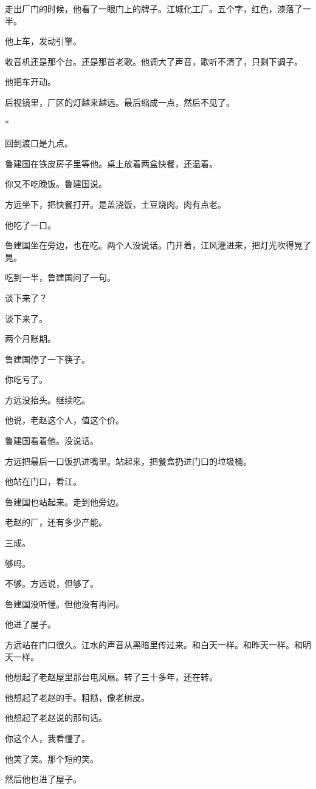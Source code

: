 \documentclass[UTF8,a5paper,11pt,openany]{ctexbook}
\newcommand{\scene}{\vspace{1em}\begin{center}*\quad*\quad*\end{center}\vspace{0.5em}}
\begin{document}
走出厂门的时候，他看了一眼门上的牌子。江城化工厂。五个字，红色，漆落了一半。

他上车，发动引擎。

收音机还是那个台。还是那首老歌。他调大了声音，歌听不清了，只剩下调子。

他把车开动。

后视镜里，厂区的灯越来越远。最后缩成一点，然后不见了。


\scene

回到渡口是九点。

鲁建国在铁皮房子里等他。桌上放着两盒快餐，还温着。

你又不吃晚饭。鲁建国说。

方远坐下，把快餐打开。是盖浇饭，土豆烧肉。肉有点老。

他吃了一口。

鲁建国坐在旁边，也在吃。两个人没说话。门开着，江风灌进来，把灯光吹得晃了晃。

吃到一半，鲁建国问了一句。

谈下来了？

谈下来了。

两个月账期。

鲁建国停了一下筷子。

你吃亏了。

方远没抬头。继续吃。

他说，老赵这个人，值这个价。

鲁建国看着他。没说话。

方远把最后一口饭扒进嘴里。站起来，把餐盒扔进门口的垃圾桶。

他站在门口，看江。

鲁建国也站起来。走到他旁边。

老赵的厂，还有多少产能。

三成。

够吗。

不够。方远说，但够了。

鲁建国没听懂。但他没有再问。

他进了屋子。

方远站在门口很久。江水的声音从黑暗里传过来。和白天一样。和昨天一样。和明天一样。

他想起了老赵屋里那台电风扇。转了三十多年，还在转。

他想起了老赵的手。粗糙，像老树皮。

他想起了老赵说的那句话。

你这个人，我看懂了。

他笑了笑。那个短的笑。

然后他也进了屋子。
\end{document}
